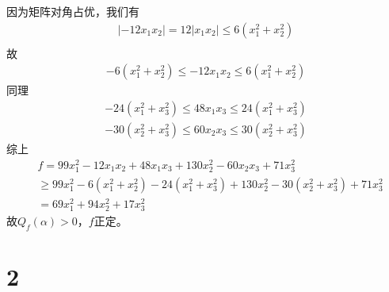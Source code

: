 \documentclass{article}
\begin{document}
\begin{itemize}
\begin{itemize}
                因为矩阵对角占优，我们有
                \begin{align*}
                  |-12 x_1 x_2| = 12 |x_1 x_2| \leq 6 (x_1^2 + x_2^2) \\
                \end{align*}
                故
                \begin{align*}
                  - 6 (x_1^2 + x_2^2) \leq -12 x_1 x_2 \leq 6 (x_1^2 + x_2^2)
                \end{align*}
                同理
                \begin{align*}
                  -24 (x_1^2 + x_3^2) \leq 48 x_1 x_3 \leq 24 (x_1^2 + x_3^2) \\
                  -30 (x_2^2 + x_3^2) \leq 60 x_2 x_3 \leq 30 (x_2^2 + x_3^2)
                \end{align*}
                综上
                \begin{align*}
                   & f = 99 x_1^2 - 12 x_1 x_2 + 48 x_1 x_3 + 130 x_2^2 -60 x_2 x_3 + 71 x_3^2                        \\
                   & \geq 99 x_1^2 - 6 (x_1^2 + x_2^2) -24 (x_1^2 + x_3^2) + 130 x_2^2 -30 (x_2^2 + x_3^2) + 71 x_3^2 \\
                   & = 69 x_1^2 + 94 x_2^2 + 17 x_3^2
                \end{align*}
                故$Q_f(\alpha) > 0$，$f$正定。
        \end{itemize}
\end{itemize}

\section*{2}
\end{document}
